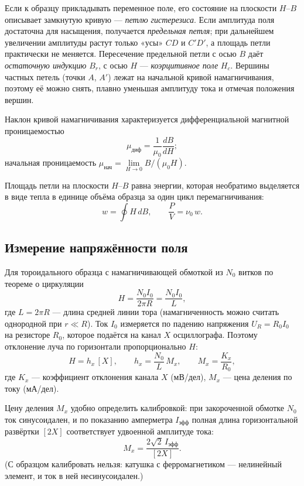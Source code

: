 \documentclass[a4paper,12pt]{article}
\begin{document}
Если к образцу прикладывать переменное поле, его состояние на плоскости
$H$--$B$ описывает замкнутую кривую --- \emph{петлю гистерезиса}. Если
амплитуда поля достаточна для насыщения, получается \emph{предельная петля};
при дальнейшем увеличении амплитуды растут только «усы» $CD$ и $C'D'$, а
площадь петли практически не меняется. Пересечение предельной петли с осью
$B$ даёт \emph{остаточную индукцию} $B_r$, с осью $H$ --- \emph{коэрцитивное
поле} $H_c$. Вершины частных петель (точки $A$, $A'$) лежат на начальной
кривой намагничивания, поэтому её можно снять, плавно уменьшая амплитуду
тока и отмечая положения вершин.

Наклон кривой намагничивания характеризуется дифференциальной магнитной
проницаемостью
\begin{equation}
    \label{eq:mu_diff}
    \mu_{\text{диф}} = \frac{1}{\mu_0}\frac{dB}{dH};
\end{equation}
начальная проницаемость $\mu_{\text{нач}} = \lim\limits_{H\to 0} B/(\mu_0 H)$.

Площадь петли на плоскости $H$--$B$ равна энергии, которая необратимо
выделяется в виде тепла в единице объёма образца за один цикл
перемагничивания:
\begin{equation}
    \label{eq:loss}
    w = \oint H\,dB, \qquad \frac{P}{V} = \nu_0\, w .
\end{equation}

\subsection{Измерение напряжённости поля}
Для тороидального образца с намагничивающей обмоткой из $N_0$ витков по
теореме о циркуляции
\begin{equation}
    \label{eq:H}
    H = \frac{N_0 I_0}{2\pi R} = \frac{N_0 I_0}{L},
\end{equation}
где $L = 2\pi R$ --- длина средней линии тора (намагниченность можно
считать однородной при $r \ll R$). Ток $I_0$ измеряется по падению
напряжения $U_R = R_0 I_0$ на резисторе $R_0$, которое подаётся на канал $X$
осциллографа. Поэтому отклонение луча по горизонтали пропорционально $H$:
\begin{equation}
    \label{eq:hx}
    H = h_x\,[X], \qquad h_x = \frac{N_0}{L}\, M_x, \qquad
    M_x = \frac{K_x}{R_0},
\end{equation}
где $K_x$ --- коэффициент отклонения канала $X$ (мВ/дел), $M_x$ --- цена
деления по току (мА/дел).

Цену деления $M_x$ удобно определить калибровкой: при закороченной обмотке
$N_0$ ток синусоидален, и по показанию амперметра $I_{\text{эфф}}$ полная
длина горизонтальной развёртки $[2X]$ соответствует удвоенной амплитуде
тока:
\begin{equation}
    \label{eq:calib_x}
    M_x = \frac{2\sqrt2\, I_{\text{эфф}}}{[2X]} .
\end{equation}
(С образцом калибровать нельзя: катушка с ферромагнетиком --- нелинейный
элемент, и ток в ней несинусоидален.)
\end{document}
